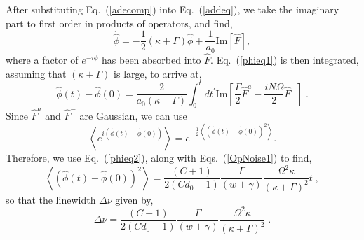 \documentclass[aps,
twocolumn,
showpacs,
superscriptaddress,groupedaddress]{revtex4}
\begin{document}
After substituting Eq.~(\ref{adecomp}) into Eq.~(\ref{addeq}), we take
the imaginary part to first order in products of operators, and find,
\begin{equation}
\ddot{\hat{\phi}} =
-\frac{1}{2}(\kappa+\Gamma) \dot{\hat{\phi}} +
\frac{1}{a_0} \text{Im} [\hat{F}],
\label{phieq1}
\end{equation}
where a factor of $e^{-i\phi}$ has been absorbed into $\hat{F}$.
Eq.~(\ref{phieq1}) is then integrated, assuming that $(\kappa+\Gamma)$
is large, to arrive at,
\begin{equation}
\hat{\phi}(t) - \hat{\phi}(0) =
\frac{2}{a_0 (\kappa+\Gamma)}
\int_0^t dt^{\prime} \text{Im}
\left[ \frac{\Gamma}{2} \hat{F}^a-\frac{i N \Omega}{2} \hat{F}^-\right]\;.
\label{phieq2}
\end{equation}
Since $ \hat{F}^a$ and $\hat{F}^-$ are Gaussian, we can use
\begin{equation}
\left< e^{i(\hat{\phi}(t) - \hat{\phi}(0))} \right> =
e^{-\frac{1}{2}\left< {( \hat{\phi}(t) - \hat{\phi}(0) )}^2 \right>}.
\end{equation}
Therefore, we use Eq.~(\ref{phieq2}), along with Eqs.~(\ref{OpNoise1})
to find,
\begin{equation}
\left<{(\hat{\phi}(t) - \hat{\phi}(0))}^2 \right> =
\frac{(C+1)}{2(Cd_0-1)} \frac{\Gamma}{(w+\gamma)}
\frac{\Omega^2 \kappa}{{(\kappa+\Gamma)}^2} t\;,
\end{equation}
so that the linewidth $\Delta \nu$ given by,
\begin{equation}
\Delta \nu =
\frac{(C+1)}{2(Cd_0-1)} \frac{\Gamma}{(w+\gamma)}
\frac{\Omega^2 \kappa}{{(\kappa+\Gamma)}^2}\;.
\label{LWHaken}
\end{equation}


\end{document}
